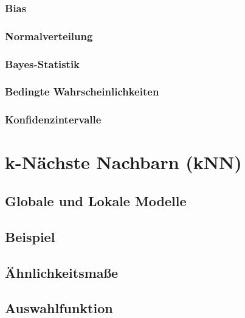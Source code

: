 		\subsection{Bias} %

		\subsection{Normalverteilung} %

		\subsection{Bayes-Statistik} %

		\subsection{Bedingte Wahrscheinlichkeiten} %

		\subsection{Konfidenzintervalle} %

\chapter{k-Nächste Nachbarn (kNN)} %

	\section{Globale und Lokale Modelle} %

	\section{Beispiel} %

	\section{Ähnlichkeitsmaße} %

	\section{Auswahlfunktion} %

